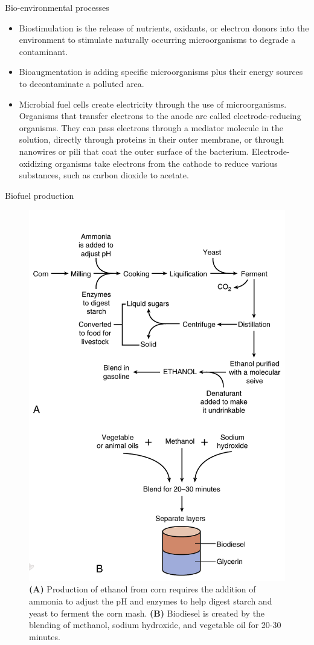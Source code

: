 \documentclass[
  ignorenonframetext,
  aspectratio=169]{beamer}
\providecommand{\tightlist}{%
  \setlength{\itemsep}{0pt}\setlength{\parskip}{0pt}}
\begin{document}
\begin{frame}{Bio-environmental processes}
\protect\hypertarget{bio-environmental-processes-1}{}
\begin{itemize}
\tightlist
\item
  \alert{Biostimulation} is the release of nutrients, oxidants, or
  electron donors into the environment to stimulate naturally occurring
  microorganisms to degrade a contaminant.
\item
  \alert{Bioaugmentation} is adding specific microorganisms plus their
  energy sources to decontaminate a polluted area.
\item
  \alert{Microbial fuel cells} create electricity through the use of
  microorganisms. Organisms that transfer electrons to the anode are
  called electrode-reducing organisms. They can pass electrons through a
  mediator molecule in the solution, directly through proteins in their
  outer membrane, or through nanowires or pili that coat the outer
  surface of the bacterium. Electrode-oxidizing organisms take electrons
  from the cathode to reduce various substances, such as carbon dioxide
  to acetate.
\end{itemize}
\end{frame}

\begin{frame}{Biofuel production}
\protect\hypertarget{biofuel-production}{}
\begin{figure}
\includegraphics[width=0.28\linewidth]{../images/biofuel_production} \caption{\textbf{(A)} Production of ethanol from corn requires the addition of ammonia to adjust the pH and enzymes to help digest starch and yeast to ferment the corn mash. \textbf{(B)} Biodiesel is created by the blending of methanol, sodium hydroxide, and vegetable oil for 20-30 minutes.}\label{fig:biofuel-production}
\end{figure}
\end{frame}
\end{document}
